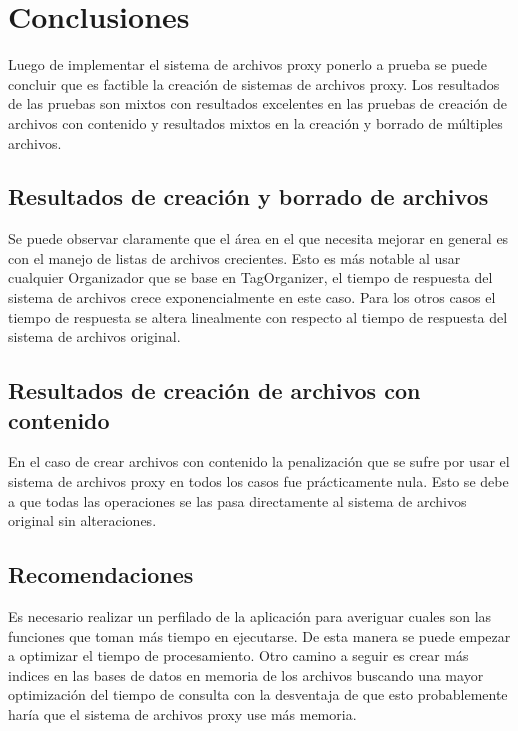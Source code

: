 \def\baselinestretch{1}
\chapter{Conclusiones}
\ifpdf
    \graphicspath{{Conclusions/ConclusionsFigs/PNG/}{Conclusions/ConclusionsFigs/PDF/}{Conclusions/ConclusionsFigs/}}
\else
    \graphicspath{{Conclusions/ConclusionsFigs/EPS/}{Conclusions/ConclusionsFigs/}}
\fi

Luego de implementar el sistema de archivos proxy ponerlo a prueba se puede concluir que es factible la creación de sistemas de archivos proxy. Los resultados de las pruebas son mixtos con resultados excelentes en las pruebas de creación de archivos con contenido y resultados mixtos en la creación y borrado de múltiples archivos.

\section{Resultados de creación y borrado de archivos}

Se puede observar claramente que el área en el que necesita mejorar en general es con el manejo de listas de archivos crecientes. Esto es más notable al usar cualquier Organizador que se base en TagOrganizer, el tiempo de respuesta del sistema de archivos crece exponencialmente en este caso. Para los otros casos el tiempo de respuesta se altera linealmente con respecto al tiempo de respuesta del sistema de archivos original.

\section{Resultados de creación de archivos con contenido}

En el caso de crear archivos con contenido la penalización que se sufre por usar el sistema de archivos proxy en todos los casos fue prácticamente nula. Esto se debe a que todas las operaciones se las pasa directamente al sistema de archivos original sin alteraciones.

\section{Recomendaciones}

Es necesario realizar un perfilado de la aplicación para averiguar cuales son las funciones que toman más tiempo en ejecutarse. De esta manera se puede empezar a optimizar el tiempo de procesamiento. Otro camino a seguir es crear más indices en las bases de datos en memoria de los archivos buscando una mayor optimización del tiempo de consulta con la desventaja de que esto probablemente haría que el sistema de archivos proxy use más memoria.




